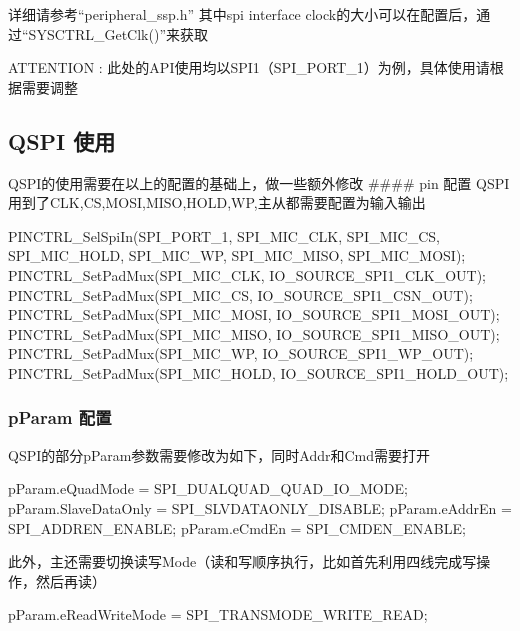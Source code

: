 \documentclass[
  12pt,
]{book}
\newenvironment{Shaded}{\begin{snugshade}}{\end{snugshade}}
\newcommand{\NormalTok}[1]{#1}
\begin{document}
详细请参考``peripheral\_ssp.h'' 其中spi interface clock的大小可以在配置后，通过``SYSCTRL\_GetClk()''来获取

ATTENTION : 此处的API使用均以SPI1（SPI\_PORT\_1）为例，具体使用请根据需要调整

\hypertarget{qspi-ux4f7fux7528}{%
\subsection{QSPI 使用}\label{qspi-ux4f7fux7528}}

QSPI的使用需要在以上的配置的基础上，做一些额外修改 \#\#\#\# pin 配置 QSPI用到了CLK,CS,MOSI,MISO,HOLD,WP,主从都需要配置为输入输出

\begin{Shaded}
\begin{Highlighting}[]
\NormalTok{    PINCTRL_SelSpiIn(SPI_PORT_1, SPI_MIC_CLK, SPI_MIC_CS, SPI_MIC_HOLD, SPI_MIC_WP, SPI_MIC_MISO, SPI_MIC_MOSI);}
\NormalTok{    PINCTRL_SetPadMux(SPI_MIC_CLK, IO_SOURCE_SPI1_CLK_OUT);}
\NormalTok{    PINCTRL_SetPadMux(SPI_MIC_CS, IO_SOURCE_SPI1_CSN_OUT);}
\NormalTok{    PINCTRL_SetPadMux(SPI_MIC_MOSI, IO_SOURCE_SPI1_MOSI_OUT);}
\NormalTok{    PINCTRL_SetPadMux(SPI_MIC_MISO, IO_SOURCE_SPI1_MISO_OUT);}
\NormalTok{    PINCTRL_SetPadMux(SPI_MIC_WP, IO_SOURCE_SPI1_WP_OUT);}
\NormalTok{    PINCTRL_SetPadMux(SPI_MIC_HOLD, IO_SOURCE_SPI1_HOLD_OUT);}
\end{Highlighting}
\end{Shaded}

\hypertarget{pparam-ux914dux7f6e}{%
\subsubsection{pParam 配置}\label{pparam-ux914dux7f6e}}

QSPI的部分pParam参数需要修改为如下，同时Addr和Cmd需要打开

\begin{Shaded}
\begin{Highlighting}[]
\NormalTok{    pParam.eQuadMode = SPI_DUALQUAD_QUAD_IO_MODE;}
\NormalTok{    pParam.SlaveDataOnly = SPI_SLVDATAONLY_DISABLE;}
\NormalTok{    pParam.eAddrEn = SPI_ADDREN_ENABLE;}
\NormalTok{    pParam.eCmdEn = SPI_CMDEN_ENABLE;}
\end{Highlighting}
\end{Shaded}

此外，主还需要切换读写Mode（读和写顺序执行，比如首先利用四线完成写操作，然后再读）

\begin{Shaded}
\begin{Highlighting}[]
\NormalTok{    pParam.eReadWriteMode = SPI_TRANSMODE_WRITE_READ;}
\end{Highlighting}
\end{Shaded}
\end{document}
